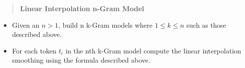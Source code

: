 \begin{quote}
    \textbf{Linear Interpolation n-Gram Model}
\end{quote}

\begin{itemize}
    \item Given an $n>1$, build n k-Gram models where $1\leq k \leq n$ such as those described above.
    \item For each token $t_i$ in the nth k-Gram model compute the linear interpolation smoothing using the formula described above.
\end{itemize}

